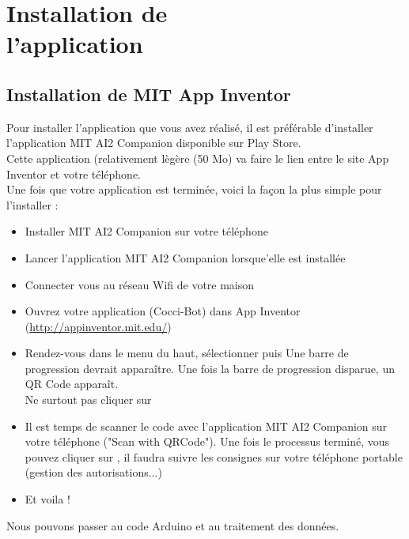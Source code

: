 \chapter{Installation de \\ l'application}

\section{Installation de MIT App Inventor}

Pour installer l'application que vous avez réalisé, il est préférable d'installer l'application MIT AI2 Companion disponible sur Play Store. \\
Cette application (relativement lègère (50 Mo) va faire le lien entre le site App Inventor et votre téléphone. \\
Une fois que votre application est terminée, voici la façon la plus simple pour l'installer : 


\begin{itemize}
    \item Installer MIT AI2 Companion sur votre téléphone 
    \item Lancer l'application MIT AI2 Companion lorsque'elle est installée 
    \item Connecter vous au réseau Wifi de votre maison 
    \item Ouvrez votre application (Cocci-Bot) dans App Inventor (\url{http://appinventor.mit.edu/}) 
    \item Rendez-vous dans le menu du haut, sélectionner  puis 
    Une barre de progression devrait apparaître.
    Une fois la barre de progression disparue, un QR Code apparaît. \\ {\color{red}Ne surtout pas cliquer sur }
    
   \item Il est temps de scanner le code avec l'application MIT AI2 Companion sur votre téléphone ("Scan with QRCode"). Une fois le processus terminé, vous pouvez cliquer sur , il faudra suivre les consignes sur votre téléphone portable (gestion des autorisations...)
   \item Et voila !
    
\end{itemize}

Nous pouvons passer au code Arduino et au traitement des données.